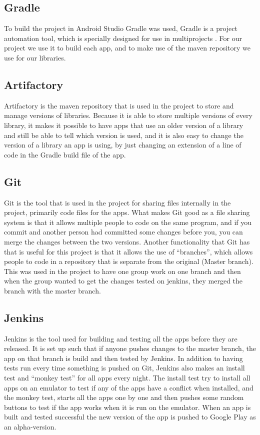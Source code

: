 \subsection{Gradle}
To build the project in Android Studio Gradle was used, Gradle is a project automation tool, which is specially designed for use in multiprojects \citep{Gradle}. For our project we use it to build each app, and to make use of the maven repository we use for our libraries.

\subsection{Artifactory}
Artifactory is the maven repository that is used in the project to store and manage versions of libraries. Because it is able to store multiple versions of every library, it makes it possible to have apps that use an older version of a library and still be able to tell which version is used, and it is also easy to change the version of a library an app is using, by just changing an extension of a line of code in the Gradle build file of the app.

\subsection{Git}
Git is the tool that is used in the project for sharing files internally in the project, primarily code files for the apps. What makes Git good as a file sharing system is that it allows multiple people to code on the same program, and if you commit and another person had committed some changes before you, you can merge the changes between the two versions. Another functionality that Git has that is useful for this project is that it allows the use of “branches”, which allows people to code in a repository that is separate from the original (Master branch). This was used in the project to have one group work on one branch and then when the group wanted to get the changes tested on jenkins, they merged the branch with the master branch.

\subsection{Jenkins}
Jenkins is the tool used for building and testing all the apps before they are released. It is set up such that if anyone pushes changes to the master branch, the app on that branch is build and then tested by Jenkins. In addition to having tests run every time something is pushed on Git, Jenkins also makes an install test and “monkey test” for all apps every night. The install test try to install all apps on an emulator to test if any of the apps have a conflict when installed, and the monkey test, starts all the apps one by one and then pushes some random buttons to test if the app works when it is run on the emulator. When an app is built and tested successful the new version of the app is pushed to Google Play as an alpha-version.

